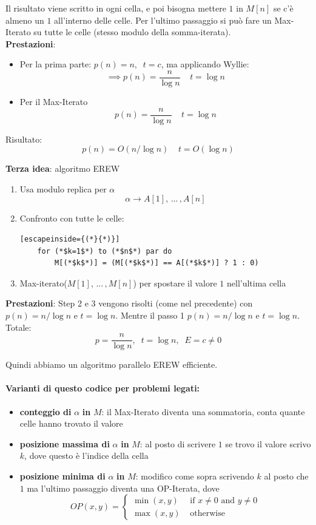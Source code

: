 \documentclass[11pt]{article}
\begin{document}
	Il risultato viene scritto in ogni cella, e poi bisogna mettere $1$ in $M[n]$ se c'è almeno un $1$ all'interno delle celle. Per l'ultimo passaggio si può fare un Max-Iterato su tutte le celle (stesso modulo della somma-iterata).\\
	
	\textbf{Prestazioni}: 
	\begin{itemize}
		\item Per la prima parte: $p(n) = n, \;\; t = c$, ma applicando Wyllie: 
		$$ \implies p(n) = \frac{n}{\log n} \;\;\;\; t = \log n$$
		\item Per il Max-Iterato 
		$$ p(n) = \frac{n}{\log n} \;\;\;\; t = \log n $$
	\end{itemize}
	Risultato: 
	$$ p(n) = O (n/\log n) \;\;\;\; t = O (\log n) $$
	
	\newpage
	
	\textbf{Terza idea}: algoritmo EREW
	\begin{enumerate}
		\item Usa modulo replica per $\alpha$
		$$ \alpha \rightarrow A[1], \, ... \, , A[n] $$
		\item Confronto con tutte le celle: 
		\begin{lstlisting}[escapeinside={(*}{*)}]
	for (*$k=1$*) to (*$n$*) par do 
		M[(*$k$*)] = (M[(*$k$*)] == A[(*$k$*)] ? 1 : 0)
		\end{lstlisting}
		\item Max-iterato($M[1], \, ... \, , M[n]$) per spostare il valore $1$ nell'ultima cella
	\end{enumerate}
	
	\textbf{Prestazioni}: 
	Step 2 e 3 vengono risolti (come nel precedente) con $ p(n) = n/\log n$ e $t = \log n$.  Mentre il passo 1 $ p(n) = n/\log n$ e $t = \log n$.\\
	Totale: 
	$$ p = \frac{n}{\log n}, \;\; t = \log n, \;\; E = c \neq 0 $$
	
	Quindi abbiamo un algoritmo parallelo EREW efficiente.\\
	
	\vfill
	
	\paragraph{Varianti di questo codice per problemi legati:}
	\begin{itemize}
		\item \textbf{conteggio di} $\alpha$ \textbf{in} $M$: il Max-Iterato diventa una sommatoria, conta quante celle hanno trovato il valore
		\item \textbf{posizione massima di} $\alpha$ \textbf{in} $M$: al posto di scrivere $1$ se trovo il valore scrivo $k$, dove questo è l'indice della cella 
		\item \textbf{posizione minima di} $\alpha$ \textbf{in} $M$: modifico come sopra scrivendo $k$ al posto che $1$ ma l'ultimo passaggio diventa una OP-Iterata, dove
		$$ OP (x,y) = \begin{cases}
			\min (x,y) & \text{ if } x \neq 0 \text{ and } y \neq 0 \\
			\max (x,y) & \text{ otherwise}
		\end{cases}$$
	\end{itemize}
	
\end{document}
